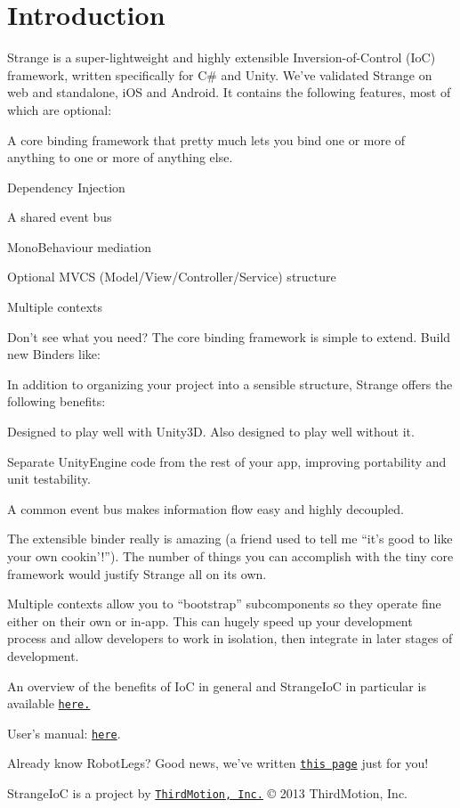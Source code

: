 \hypertarget{index_intro_sec}{}\section{Introduction}\label{index_intro_sec}
Strange is a super-\/lightweight and highly extensible Inversion-\/of-\/\-Control (Io\-C) framework, written specifically for C\# and Unity. We’ve validated Strange on web and standalone, i\-O\-S and Android. It contains the following features, most of which are optional\-: 
\begin{DoxyItemize}
\item A core binding framework that pretty much lets you bind one or more of anything to one or more of anything else. 
\item Dependency Injection 
\item A shared event bus 
\item Mono\-Behaviour mediation 
\item Optional M\-V\-C\-S (Model/\-View/\-Controller/\-Service) structure 
\item Multiple contexts 
\item Don’t see what you need? The core binding framework is simple to extend. Build new Binders like\-: 
\end{DoxyItemize}In addition to organizing your project into a sensible structure, Strange offers the following benefits\-: 
\begin{DoxyItemize}
\item Designed to play well with Unity3\-D. Also designed to play well without it. 
\item Separate Unity\-Engine code from the rest of your app, improving portability and unit testability. 
\item A common event bus makes information flow easy and highly decoupled. 
\item The extensible binder really is amazing (a friend used to tell me “it’s good to like your own cookin’!”). The number of things you can accomplish with the tiny core framework would justify Strange all on its own. 
\item Multiple contexts allow you to “bootstrap” subcomponents so they operate fine either on their own or in-\/app. This can hugely speed up your development process and allow developers to work in isolation, then integrate in later stages of development. 
\end{DoxyItemize}An overview of the benefits of Io\-C in general and Strange\-Io\-C in particular is available \href{../../exec.html}{\tt here.} \par
 User's manual\-: \href{../../TheBigStrangeHowTo.html}{\tt here}. \par
 Already know Robot\-Legs? Good news, we've written \href{../../rl.html}{\tt this page} just for you!

Strange\-Io\-C is a project by \href{http://thirdmotion.com/}{\tt Third\-Motion, Inc.} \copyright{} 2013 Third\-Motion, Inc. 